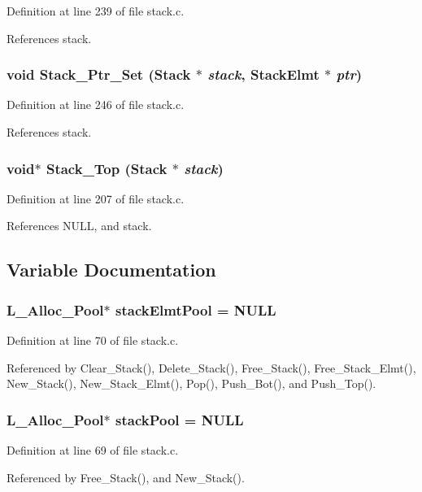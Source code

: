 Definition at line 239 of file stack.c.

References stack.
\subsubsection{\setlength{\rightskip}{0pt plus 5cm}void Stack\_\-Ptr\_\-Set (\bf{Stack} $\ast$ {\em stack}, \bf{Stack\-Elmt} $\ast$ {\em ptr})}\label{stack_8c_e8b6e5381a362b06650904e94d526255}




Definition at line 246 of file stack.c.

References stack.
\subsubsection{\setlength{\rightskip}{0pt plus 5cm}void$\ast$ Stack\_\-Top (\bf{Stack} $\ast$ {\em stack})}\label{stack_8c_88b22023dbd5a58c3207a292739cc972}




Definition at line 207 of file stack.c.

References NULL, and stack.

\subsection{Variable Documentation}
\subsubsection{\setlength{\rightskip}{0pt plus 5cm}\bf{L\_\-Alloc\_\-Pool}$\ast$ \bf{stack\-Elmt\-Pool} = NULL\hspace{0.3cm}{\tt  [static]}}\label{stack_8c_a936d9931022acd759ff28299f62830c}




Definition at line 70 of file stack.c.

Referenced by Clear\_\-Stack(), Delete\_\-Stack(), Free\_\-Stack(), Free\_\-Stack\_\-Elmt(), New\_\-Stack(), New\_\-Stack\_\-Elmt(), Pop(), Push\_\-Bot(), and Push\_\-Top().
\subsubsection{\setlength{\rightskip}{0pt plus 5cm}\bf{L\_\-Alloc\_\-Pool}$\ast$ \bf{stack\-Pool} = NULL\hspace{0.3cm}{\tt  [static]}}\label{stack_8c_8a87a5c6e37f38dc6c3b5b09986fd969}




Definition at line 69 of file stack.c.

Referenced by Free\_\-Stack(), and New\_\-Stack().